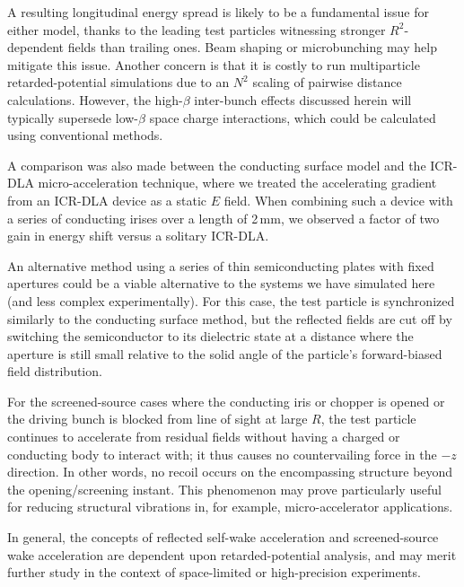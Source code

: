 \documentclass[reprint,
               amsmath,amssymb,nofootinbib, aps%
              ]{revtex4-2}
\begin{document}
A resulting longitudinal energy spread is likely to be a fundamental issue for either model, thanks to the leading test particles witnessing stronger $R^2$-dependent fields than trailing ones. Beam shaping or microbunching may help mitigate this issue. Another concern is that it is costly to run multiparticle retarded-potential simulations due to an $N^2$ scaling of pairwise distance calculations. However, the high-$\beta$ inter-bunch effects discussed herein will typically supersede low-$\beta$ space charge interactions, which could be calculated using conventional methods.

A comparison was also made between the conducting surface model and the ICR-DLA micro-acceleration technique, where we treated the accelerating gradient from an ICR-DLA device as a static $E$ field. When combining such a device with a series of conducting irises over a length of 2\,mm, we observed a factor of two gain in energy shift versus a solitary ICR-DLA.

An alternative method using a series of thin semiconducting plates with fixed apertures could be a viable alternative to the systems we have simulated here (and less complex experimentally). For this case, the test particle is synchronized similarly to the conducting surface method, but the reflected fields are cut off by switching the semiconductor to its dielectric state at a distance where the aperture is still small relative to the solid angle of the particle's forward-biased field distribution.

For the screened-source cases where the conducting iris or chopper is opened or the driving bunch is blocked from line of sight at large $R$, the test particle continues to accelerate from residual fields without having a charged or conducting body to interact with; it thus causes no countervailing force in the $-z$ direction. In other words, no recoil occurs on the encompassing structure beyond the opening/screening instant. This phenomenon may prove particularly useful for reducing structural vibrations in, for example, micro-accelerator applications.

In general, the concepts of reflected self-wake acceleration and screened-source wake acceleration are dependent upon retarded-potential analysis, and may merit further study in the context of space-limited or high-precision experiments.


%
%
%
%

\end{document}
